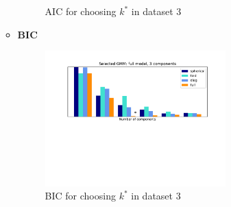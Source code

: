 \documentclass[12pt,a4paper,UTF8,fntef]{article}
\begin{document}
\begin{enumerate}
\begin{itemize}
\begin{figure}[!h]
		\caption{AIC for choosing $k^*$ in dataset 3}
	\end{figure}
	\item \textbf{BIC}
	\begin{figure}[!h]
		\centering
		\includegraphics[width=0.7\textwidth]{BIC_3.pdf}
		\caption{BIC for choosing $k^*$ in dataset 3}
	\end{figure}
	

\end{itemize}
\end{enumerate}
\end{document}
